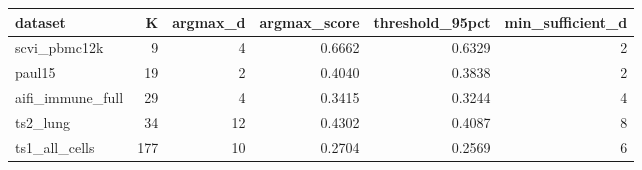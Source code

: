 \begin{tabular}{lrrrrr}
\toprule
dataset & K & argmax\_d & argmax\_score & threshold\_95pct & min\_sufficient\_d \\
\midrule
scvi\_pbmc12k & 9 & 4 & 0.6662 & 0.6329 & 2 \\
paul15 & 19 & 2 & 0.4040 & 0.3838 & 2 \\
aifi\_immune\_full & 29 & 4 & 0.3415 & 0.3244 & 4 \\
ts2\_lung & 34 & 12 & 0.4302 & 0.4087 & 8 \\
ts1\_all\_cells & 177 & 10 & 0.2704 & 0.2569 & 6 \\
\bottomrule
\end{tabular}
